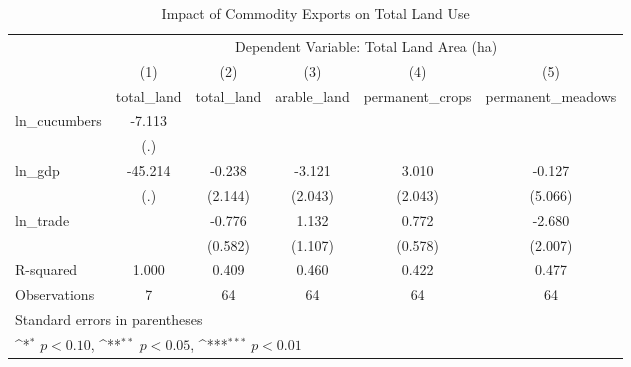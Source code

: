 \begin{table}[htbp]\centering
\def\sym#1{\ifmmode^{#1}\else\(^{#1}\)\fi}
\caption{Impact of Commodity Exports on Total Land Use\label{tab1}}
\begin{tabular}{l*{5}{c}}
\toprule
            &\multicolumn{5}{c}{Dependent Variable: Total Land Area (ha)}                                                 \\\cmidrule(lr){2-6}
            &\multicolumn{1}{c}{(1)}&\multicolumn{1}{c}{(2)}&\multicolumn{1}{c}{(3)}&\multicolumn{1}{c}{(4)}&\multicolumn{1}{c}{(5)}\\
            &\multicolumn{1}{c}{total\_land}&\multicolumn{1}{c}{total\_land}&\multicolumn{1}{c}{arable\_land}&\multicolumn{1}{c}{permanent\_crops}&\multicolumn{1}{c}{permanent\_meadows}\\
\midrule
ln\_cucumbers&      -7.113         &                     &                     &                     &                     \\
            &         (.)         &                     &                     &                     &                     \\
\addlinespace
ln\_gdp      &     -45.214         &      -0.238         &      -3.121         &       3.010         &      -0.127         \\
            &         (.)         &     (2.144)         &     (2.043)         &     (2.043)         &     (5.066)         \\
\addlinespace
ln\_trade    &                     &      -0.776         &       1.132         &       0.772         &      -2.680         \\
            &                     &     (0.582)         &     (1.107)         &     (0.578)         &     (2.007)         \\
\midrule
R-squared   &       1.000         &       0.409         &       0.460         &       0.422         &       0.477         \\
Observations&           7         &          64         &          64         &          64         &          64         \\
\bottomrule
\multicolumn{6}{l}{\footnotesize Standard errors in parentheses}\\
\multicolumn{6}{l}{\footnotesize \sym{*} \(p<0.10\), \sym{**} \(p<0.05\), \sym{***} \(p<0.01\)}\\
\end{tabular}
\end{table}
